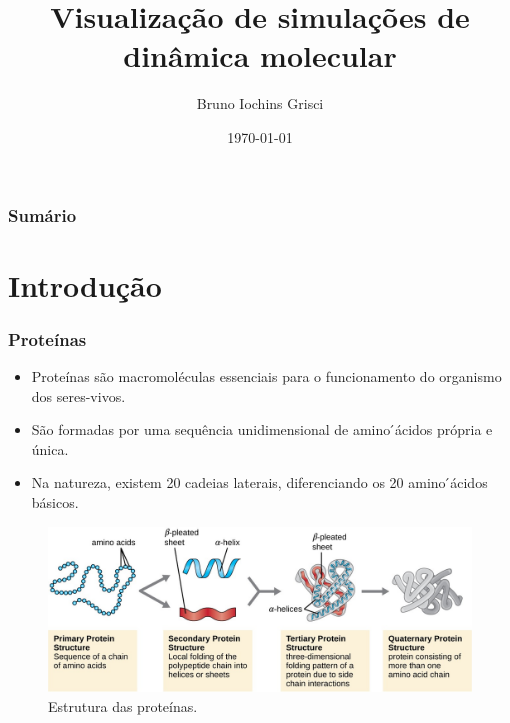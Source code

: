 \documentclass{beamer}
\title[T2]{Visualização de simulações de dinâmica molecular} %
\author{Bruno Iochins Grisci} %
\institute[UFRGS] %
{
Universidade Federal do Rio Grande do Sul \\ %
\medskip
\textit{bigrisci@inf.ufrgs.br} %
}
\date{\today} %
\begin{document}
\begin{frame}
\titlepage %
\end{frame}

\begin{frame}
\frametitle{Sumário} %
\tableofcontents %
\end{frame}


\section{Introdução} %

\begin{frame}
\frametitle{Proteínas}
\begin{itemize}
\item Proteínas são macromoléculas essenciais para o funcionamento do organismo dos seres-vivos.
\item São formadas por uma sequência unidimensional de amino ́ácidos própria e única.
\item Na natureza, existem 20 cadeias laterais, diferenciando os 20 amino ́ácidos básicos.
\end{itemize}
\begin{figure}
\includegraphics[width=0.7\linewidth]{figs/protein.jpg}
\caption{Estrutura das proteínas.} 
\label{fig:protein}
\end{figure}
\end{frame}
\end{document}
